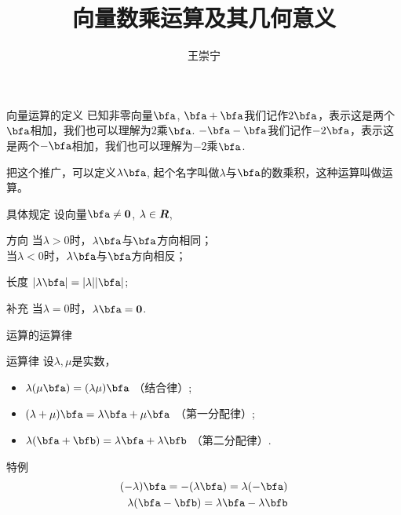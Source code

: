 \documentclass[mathserif,blue]{beamer}
\begin{document}
\title{向量数乘运算及其几何意义}
\author{王崇宁}
\logo{\threesides}
\maketitle

\begin{frame}{向量运算的定义}
  已知非零向量$\bfa$, $\bfa+\bfa$我们记作$2\bfa$，表示这是两个$\bfa$相加，我们也可以理解为$2$乘$\bfa$. $-\bfa-\bfa$我们记作$-2\bfa$，表示这是两个$-\bfa$相加，我们也可以理解为$-2$乘$\bfa$. 

把这个推广，可以定义$\lambda\bfa$, 起个名字叫做$\lambda$与$\bfa$的数乘积，这种运算叫做运算。 
\end{frame}

\begin{frame}{具体规定}
  设向量$\bfa\ne\mathbf 0$, $\lambda\in{\bm R}$, 
  \begin{block}{方向}
    当$\lambda>0$时，$\lambda\bfa$与$\bfa$方向相同；\\
    当$\lambda<0$时，$\lambda\bfa$与$\bfa$方向相反；
  \end{block}
  \begin{block}{长度}
    $|\lambda\bfa|=|\lambda||\bfa|$;
  \end{block}
  \begin{block}{补充}
    当$\lambda=0$时，$\lambda\bfa=\mathbf 0$.
  \end{block}
\end{frame}

\begin{frame}{运算的运算律}
  \begin{alertblock}{运算律}
    设$\lambda,\mu$是实数， 
    \begin{center}\begin{itemize}
      \item $\lambda(\mu\bfa)=(\lambda\mu)\bfa$ （结合律）;
      \item $(\lambda+\mu)\bfa=\lambda\bfa+\mu\bfa$ （第一分配律）;
      \item $\lambda(\bfa+\bfb)=\lambda\bfa+\lambda\bfb$ （第二分配律）.
    \end{itemize}\end{center}
  \end{alertblock}
  \begin{exampleblock}{特例}
    \begin{align*}
      (-\lambda)\bfa=-(\lambda\bfa)=\lambda(-\bfa)\\
      \lambda(\bfa-\bfb)=\lambda\bfa-\lambda\bfb 
    \end{align*}
  \end{exampleblock}
\end{frame}
\end{document}
